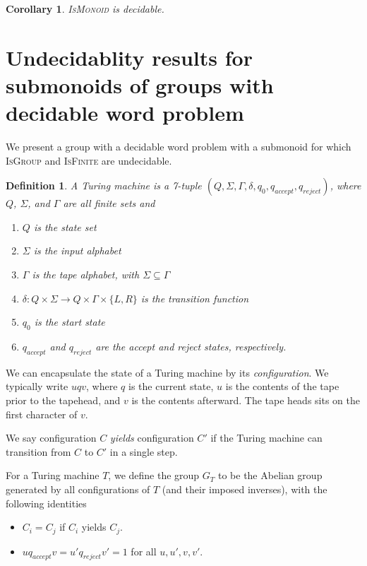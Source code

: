 \documentclass[10pt]{article} %
\newtheorem{corollary}{Corollary}
\newtheorem{definition}{Definition}
\newcommand{\defn}[1]{\textit{#1}}
\newcommand{\decprob}[1]{\textsc{#1}}
\begin{document}
    \begin{corollary}
    \decprob{IsMonoid} is decidable.
    \end{corollary}

    \section{Undecidablity results for submonoids of groups with decidable word problem}

    We present a group with a decidable word problem with a submonoid for which \textsc{IsGroup} and \textsc{IsFinite} are undecidable. 

    \begin{definition}
    A \defn{Turing machine} is a 7-tuple $(Q, \Sigma, \Gamma, \delta, q_0, q_{accept}, q_{reject})$, where $Q$, $\Sigma$, and $\Gamma$ are all finite sets and 
    \begin{enumerate}
    \item $Q$ is the state set
    \item $\Sigma$ is the input alphabet
    \item $\Gamma$ is the tape alphabet, with $\Sigma \subseteq \Gamma$
    \item $\delta : Q \times \Sigma \rightarrow Q \times \Gamma \times \{L, R \}$ is the transition function
    \item $q_0$ is the start state
    \item $q_{accept}$ and $q_{reject}$ are the accept and reject states, respectively.
    \end{enumerate}
    \end{definition}

    We can encapsulate the state of a Turing machine by its \defn{configuration}. We typically write $u q v$, where $q$ is the current state, $u$ is the contents of the tape prior to the tapehead, and $v$ is the contents afterward. The tape heads sits on the first character of $v$. 

    We say configuration $C$ \defn{yields} configuration $C'$ if the Turing machine can transition from $C$ to $C'$ in a single step.

    For a Turing machine $T$, we define the group $G_T$ to be the Abelian group generated by all configurations of $T$ (and their imposed inverses), with the following identities
    \begin{itemize}
    \item $C_i = C_j$ if $C_i$ yields $C_j$.
    \item $uq_{accept}v = u'q_{reject}v' = 1$ for all $u, u', v, v'$.
    \end{itemize}
\end{document}
